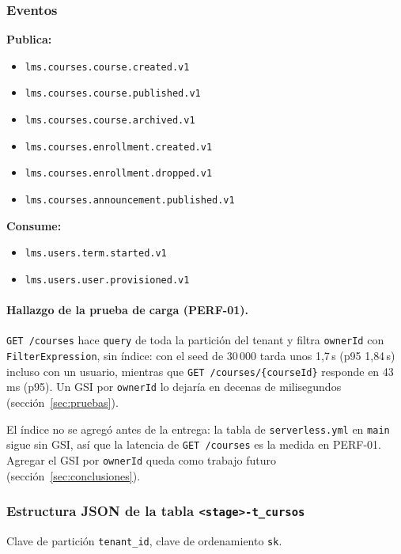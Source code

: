 \subsubsection{Eventos}
\textbf{Publica:}
\begin{itemize}
  \item \texttt{lms.courses.course.created.v1}
  \item \texttt{lms.courses.course.published.v1}
  \item \texttt{lms.courses.course.archived.v1}
  \item \texttt{lms.courses.enrollment.created.v1}
  \item \texttt{lms.courses.enrollment.dropped.v1}
  \item \texttt{lms.courses.announcement.published.v1}
\end{itemize}

\textbf{Consume:}
\begin{itemize}
  \item \texttt{lms.users.term.started.v1}
  \item \texttt{lms.users.user.provisioned.v1}
\end{itemize}

\paragraph{Hallazgo de la prueba de carga (PERF-01).}
\texttt{GET /courses} hace \texttt{query} de toda la partición del tenant y filtra \texttt{ownerId} con
\texttt{FilterExpression}, sin índice: con el seed de 30\,000 tarda unos 1{,}7\,s (p95 1{,}84\,s)
incluso con un usuario, mientras que \texttt{GET /courses/\{courseId\}} responde en 43\,ms (p95). Un
GSI por \texttt{ownerId} lo dejaría en decenas de milisegundos (sección~\ref{sec:pruebas}).

El índice no se agregó antes de la entrega: la tabla de \texttt{serverless.yml} en \texttt{main} sigue
sin GSI, así que la latencia de \texttt{GET /courses} es la medida en PERF-01. Agregar el GSI por
\texttt{ownerId} queda como trabajo futuro (sección~\ref{sec:conclusiones}).

\subsubsection{Estructura JSON de la tabla \texttt{<stage>-t\_cursos}}
Clave de partición \texttt{tenant\_id}, clave de ordenamiento \texttt{sk}.

